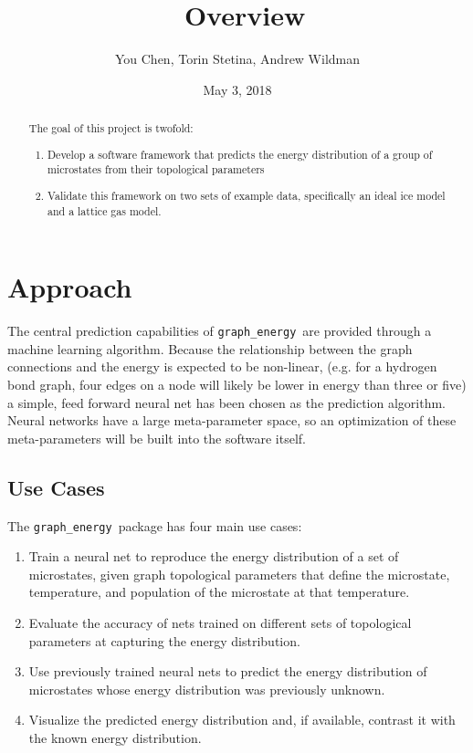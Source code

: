 \documentclass[paper=a4, fontsize=12pt]{article}
\title{
\softname\ Overview
}
\author{You Chen, Torin Stetina, Andrew Wildman}
\date{May 3, 2018}
\newcommand{\softname}{\texttt{graph\_energy}}
\begin{document}
\maketitle


\begin{abstract}
  The goal of this project is twofold:
  \begin{enumerate}
    \item Develop a software framework that predicts the energy distribution of a group of microstates from their topological parameters
    \item Validate this framework on two sets of example data,
      specifically an ideal ice model and a lattice gas model.
  \end{enumerate}
\end{abstract}

\section*{Approach}


The central prediction capabilities of \softname\ are provided through a machine learning algorithm.
Because the relationship between the graph connections and the energy is expected to be non-linear,
(e.g. for a hydrogen bond graph, four edges on a node will likely be lower in energy than three or five)
a simple, feed forward neural net has been chosen as the prediction algorithm.
Neural networks have a large meta-parameter space,
so an optimization of these meta-parameters will be built into the software itself.

\subsection*{Use Cases}

The \softname\ package has four main use cases:

\begin{enumerate}
  \item Train a neural net to reproduce the energy distribution of a set of microstates,
    given graph topological parameters that define the microstate, temperature, and population of the microstate at that temperature.
  \item Evaluate the accuracy of nets trained on different sets of topological parameters at capturing the energy distribution. 
  \item Use previously trained neural nets to predict the energy distribution of microstates whose energy distribution was previously unknown.
  \item Visualize the predicted energy distribution and, if available, contrast it with the known energy distribution.
\end{enumerate}
\end{document}

